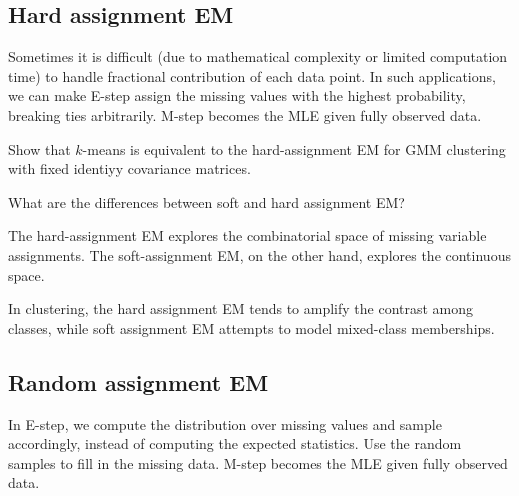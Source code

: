 \documentclass{discussion}
\begin{document}
\subsection{Hard assignment EM}
Sometimes it is difficult (due to mathematical complexity or limited computation time) to handle fractional contribution of each data point. In such applications, we can make E-step assign the missing values with the highest probability, breaking ties arbitrarily. M-step becomes the MLE given fully observed data.

\begin{exercise}
	Show that $k$-means is equivalent to the hard-assignment EM for GMM clustering with fixed identiyy covariance matrices.
\end{exercise}

\begin{exercise}
What are the differences between soft and hard assignment EM?
\end{exercise}
	The hard-assignment EM explores the combinatorial space of missing variable assignments. The soft-assignment EM, on the other hand, explores the continuous space.

	In clustering, the hard assignment EM tends to amplify the contrast among classes, while soft assignment EM attempts to model mixed-class memberships.

\subsection{Random assignment EM}

In E-step, we compute the distribution over missing values and sample accordingly, instead of computing the expected statistics. Use the random samples to fill in the missing data. M-step becomes the MLE given fully observed data.
\end{document}
